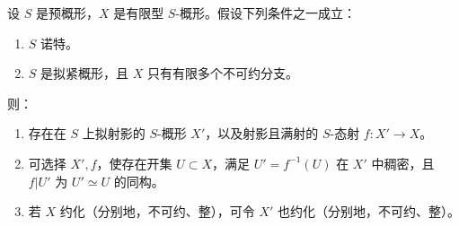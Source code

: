设 $S$ 是预概形，$X$ 是有限型 $S$-概形。假设下列条件之一成立：
\begin{enumerate}[label=\alph*)]
\item $S$ 诺特。
\item $S$ 是拟紧概形，且 $X$ 只有有限多个不可约分支。
\end{enumerate}
则：
\begin{enumerate}[label=\textup{(\roman*)}]
\item 存在在 $S$ 上拟射影的 $S$-概形 $X'$，以及射影且满射的 $S$-态射 $f:X'\to X$。
\item 可选择 $X',f$，使存在开集 $U\subset X$，满足 $U'=f^{-1}(U)$ 在 $X'$ 中稠密，且 $f|U'$ 为 $U'\simeq U$ 的同构。
\item 若 $X$ 约化（分别地，不可约、整），可令 $X'$ 也约化（分别地，不可约、整）。
\end{enumerate}
